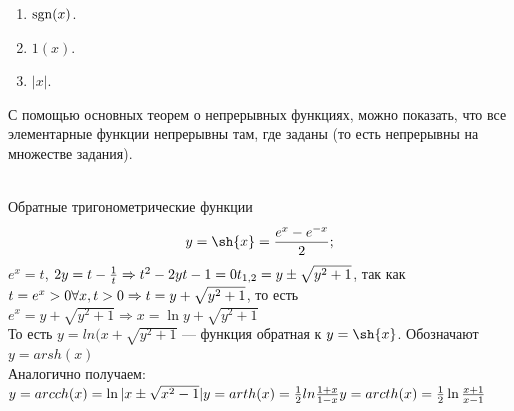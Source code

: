 \begin{enumerate}
	\item $\operatorname{sgn}(x)$.
	\item $1(x)$.
	\item $|x|$.
\end{enumerate}
С помощью основных теорем о непрерывных функциях, можно показать, что все элементарные функции непрерывны там, где заданы (то есть непрерывны на множестве задания).\\\\
\begin{example}{ Обратные тригонометрические функции}
	$$y = \sh{x} = \frac{e^x - e^{-x}}{2};$$ $e^{x} = t$,
	$2y = t -\frac{1}{t} \Rightarrow t^2 - 2yt - 1 =0\\
	t_{1,2} = y \pm \sqrt{y^2+1}$, так как $t=e^x > 0 \forall x, t >0\\
	\Rightarrow t = y + \sqrt{y^2+1}$, то есть $e^x = y + \sqrt{y^2+1} \Rightarrow x = \ln{y + \sqrt{y^2+1}}$\\
	То есть $y = ln(x + \sqrt{y^2+1}$ --- функция обратная к $y = \sh{x}$. Обозначают $y = arsh(x)$\\
	Аналогично получаем:
	$y = arcch(x) = \ln{|x \pm \sqrt{x^2 -1}|}\\
	y = arth(x) = \frac{1}{2}ln{\frac{1+x}{1-x}}\\
	y = arcth(x) = \frac{1}{2}\ln{\frac{x+1}{x-1}}$
\end{example}
